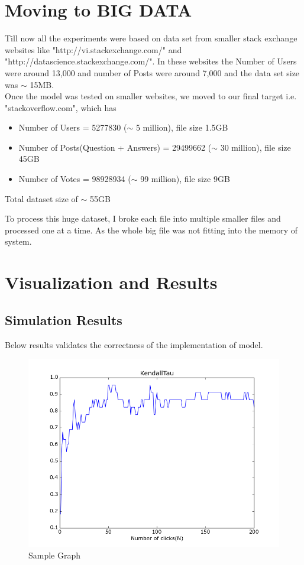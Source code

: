 \documentclass{article}
\begin{document}
\section{Moving to BIG DATA}
Till now all the experiments were based on data set from smaller stack exchange
websites like "http://vi.stackexchange.com/" and "http://datascience.stackexchange.com/".
In these websites the Number of Users were around 13,000 and number of Posts were
around 7,000 and the data set size was $\sim$ 15MB.\\

Once the model was tested on smaller websites, we moved to our final target i.e.
"stackoverflow.com", which has \\
\begin{itemize}
    \item Number of Users = 5277830 ($\sim$ 5 million), file size 1.5GB
    \item Number of Posts(Question + Answers) = 29499662 ($\sim$ 30 million), file size 45GB
    \item Number of Votes = 98928934 ($\sim$ 99 million), file size 9GB
\end{itemize}
Total dataset size of $\sim$ 55GB

To process this huge dataset, I broke each file into multiple smaller files and 
processed one at a time. As the whole big file was not fitting into the memory of 
system.\\
\section{Visualization and Results}
\subsection{Simulation Results}
Below results validates the correctness of the implementation of model.\\
\begin{figure}[H]
\centering
\includegraphics[width=12cm]{results_ver2/KTau-User.png}
\caption{Sample Graph}
\label{fig1:overview}
\end{figure}
\end{document}
